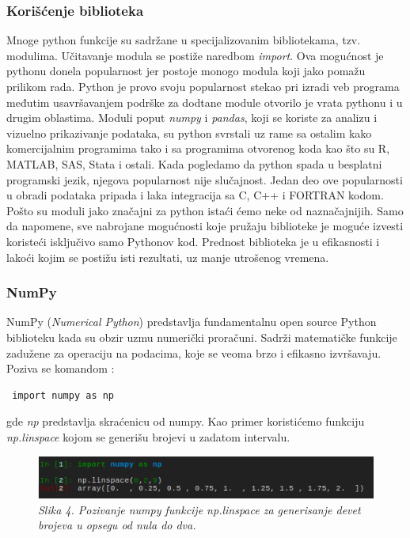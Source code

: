 \documentclass[12pt]{article}
\begin{document}
 \subsubsection{Korišćenje biblioteka}
Mnoge python funkcije su sadržane u specijalizovanim bibliotekama, tzv. modulima. Učitavanje modula se postiže naredbom \textsl{import}. Ova mogućnost je pythonu donela popularnost jer postoje monogo modula koji jako pomažu prilikom rada. Python je provo svoju popularnost stekao pri izradi veb programa međutim usavršavanjem podrške za dodtane module otvorilo je vrata pythonu i u drugim oblastima. Moduli poput \textsl{numpy} i \textsl{pandas}, koji se koriste za analizu i vizuelno prikazivanje podataka, su python svrstali uz rame sa ostalim kako komercijalnim programima tako i sa programima otvorenog koda kao što su R, MATLAB, SAS, Stata i ostali. Kada pogledamo da python spada u besplatni programski jezik, njegova popularnost nije slučajnost. Jedan deo ove popularnosti u obradi podataka pripada i laka integracija sa C, C++ i FORTRAN kodom.  
Pošto su moduli jako značajni za python istaći ćemo neke od naznačajnijih. Samo da napomene, sve nabrojane mogućnosti koje pružaju biblioteke je moguće izvesti koristeći isključivo samo Pythonov kod. Prednost biblioteka je u efikasnosti i lakoći kojim se postižu isti rezultati, uz manje utrošenog vremena.  
\subsubsection{NumPy}
NumPy (\textsl{Numerical Python}) predstavlja fundamentalnu open source Python biblioteku kada su obzir uzmu numerički proračuni. Sadrži matematičke funkcije zadužene za operaciju na podacima, koje se veoma brzo i efikasno izvršavaju. Poziva se komandom :
\begin{lstlisting}
 import numpy as np
\end{lstlisting}
gde \textsl{np} predstavlja skraćenicu od numpy. Kao primer koristićemo funkciju \textsl{np.linspace} kojom se generišu brojevi u zadatom intervalu.  
\begin{figure}[h!]
\centering
\includegraphics[width=1.\textwidth]{Screenshot.png}
\caption*{\textsl{Slika 4. Pozivanje numpy funkcije np.linspace za generisanje devet brojeva u opsegu od nula do dva. }}
\end{figure}
\end{document}
